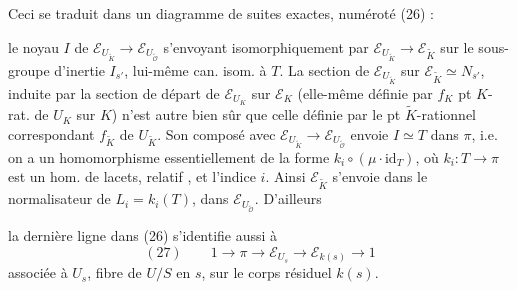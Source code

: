 \documentclass[11pt,a4paper]{article}
\begin{document}
Ceci se traduit dans un diagramme de suites exactes, numéroté (26) :



le noyau $I$ de $\mathcal{E}_{U_{\tilde{K}}} \to \mathcal{E}_{U_{\tilde{\mathcal{O}}}}$
s'envoyant isomorphiquement par $\mathcal{E}_{U_{\tilde{K}}} \to \mathcal{E}_{\tilde{K}}$
sur le sous-groupe d'inertie $I_{s'}$, lui-même can. isom. à $T$. La section de
$\mathcal{E}_{U_{\tilde{K}}}$ sur $\mathcal{E}_{\tilde{K}} \simeq N_{s'}$,
induite par la section de départ de $\mathcal{E}_{U_K}$ sur $\mathcal{E}_K$
(elle-même définie par $f_K$ pt $K$-rat. de $U_K$ sur $K$) n'est autre bien sûr
que celle définie par le pt $\tilde{K}$-rationnel correspondant $f_{\tilde{K}}$
de $U_{\tilde{K}}$. Son composé avec
$\mathcal{E}_{U_{\tilde{K}}} \to \mathcal{E}_{U_{\tilde{\mathcal{O}}}}$ envoie
$I \simeq T$ dans $\pi$, i.e. on a un homomorphisme essentiellement de la forme
$k_i \circ (\mu \cdot \mathrm{id}_T)$, où $k_i \colon T \to \pi$ est un hom. de
lacets, relatif  \ill{}, et l'indice $i$.
Ainsi $\mathcal{E}_{\tilde{K}}$ s'envoie dans le normalisateur de
$L_i = k_i(T)$, dans $\mathcal{E}_{U_{\tilde{\mathcal{O}}}}$. D'ailleurs


la dernière ligne dans (26) s'identifie aussi à
\[
  (27)\qquad 1 \to \pi \to \mathcal{E}_{U_s} \to \mathcal{E}_{k(s)} \to 1
\]
associée à $U_s$, fibre de $U/S$ en $s$, sur le corps résiduel $k(s)$.
\end{document}
